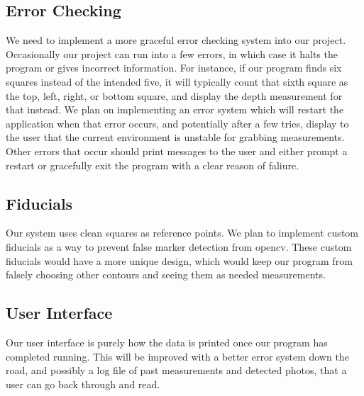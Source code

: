 \documentclass[onecolumn, draftclsnofoot,10pt, compsoc]{IEEEtran}
\begin{document}
\subsection{Error Checking}
We need to implement a more graceful error checking system into our project.  Occasionally our project can run into a few errors, in which case it halts the program or gives incorrect information.  For instance, if our program finds six squares instead of the intended five, it will typically count that sixth square as the top, left, right, or bottom square, and display the depth measurement for that instead.  We plan on implementing an error system which will restart the application when that error occurs, and potentially after a few tries, display to the user that the current environment is unstable for grabbing measurements.  Other errors that occur should print messages to the user and either prompt a restart or gracefully exit the program with a clear reason of faliure.


\subsection{Fiducials}
Our system uses clean squares as reference points. We plan to implement custom fiducials as a way to prevent false marker detection from opencv.  These custom fiducials would have a more unique design, which would keep our program from falsely choosing other contours and seeing them as needed measurements.

\subsection{User Interface}
Our user interface is purely how the data is printed once our program has completed running. This will be improved with a better error system down the road, and possibly a log file of past measurements and detected photos, that a user can go back through and read.
\end{document}

